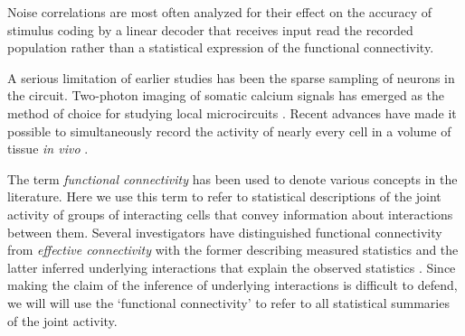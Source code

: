 Noise correlations are most often analyzed for their effect on the accuracy of stimulus coding by a linear decoder that receives input read the recorded population \citep{Averbeck:2006,Ecker:2011} rather than a statistical expression of the functional connectivity. 

A serious limitation of earlier studies has been the sparse sampling of neurons in the circuit.  Two-photon imaging of somatic calcium signals has emerged as the method of choice for studying local microcircuits \citep{Stosiek:2003,Ko:2011,Ko:2013,Hofer:2011}.  Recent advances have made it possible to simultaneously record the activity of nearly every cell in a volume of tissue \emph{in vivo} \citep{Reddy:2005, Katona:2012, Cotton:2013}. 


The term \emph{functional connectivity} has been used to denote various concepts in the literature. Here we use this term to refer to statistical descriptions of the joint activity of groups of interacting cells that convey information about interactions between them.  Several investigators have distinguished functional connectivity from \emph{effective connectivity} with the former describing measured statistics and the latter inferred underlying interactions that explain the observed statistics \citep{Aertsen:1989,Friston:2011}. Since making the claim of the inference of underlying interactions is difficult to defend, we will will use the `functional connectivity' to refer to all statistical summaries of the joint activity. 

